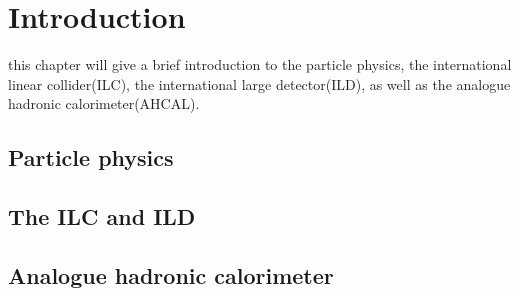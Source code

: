 \chapter{Introduction}
\par this chapter will give a brief introduction to the particle physics, the international linear collider(ILC), the international large detector(ILD), as well as the analogue hadronic calorimeter(AHCAL).

\section{Particle physics}

\section{The ILC and ILD}

\section{Analogue hadronic calorimeter}